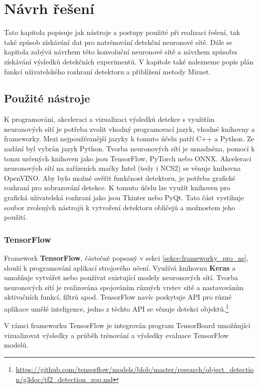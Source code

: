 \chapter{Návrh řešení}
Tato kapitola popisuje jak nástroje a postupy použité při realizaci řešení, tak také způsob získávání dat pro natrénování detekční neuronové sítě. Dále se kapitola zabývá návrhem této konvoluční neuronové sítě a návrhem způsobu získávání výsledků detekčních experimentů. V kapitole také nalezneme popis plán funkcí uživatelského rozhraní detektoru a přiblížení metody Mirnet.

\section{Použité nástroje}
\label{sekce:pouzite_nastroje}
K programování, akceleraci a vizualizaci výsledků detekce s využitím neuronových sítí je potřeba zvolit vhodný programovací jazyk, vhodné knihovny a frameworky. Mezi nejpoužívanější jazyky k tomuto účelu patří C++ a Python. Ze zadání byl vybrán jazyk Python. Tvorba neuronových sítí je usnadněna, pomocí k tomu určených knihoven jako jsou TensorFlow, PyTorch nebo ONNX. Akceleraci neuronových sítí na zařízeních značky Intel (tedy i NCS2) se věnuje knihovna OpenVINO. Aby bylo možné ověřit funkčnost detektoru, je potřeba grafické rozhraní pro zobrazování detekce. K tomuto účelu lze využít knihoven pro grafická uživatelská rozhraní jako jsou Tkinter nebo PyQt. Tato část vystihuje soubor zvolených nástrojů k vytvoření detektoru obličejů a možnostem jeho použití.

\subsection*{TensorFlow}
Framework \textbf{TensorFlow}, částečně popsaný v sekci \ref{sekce:frameworky_pro_ns}, slouží k programování aplikací strojového učení. Využívá knihovnu \textbf{Keras} a umožňuje vytvářet nebo používat existující modely neuronových sítí. Tvorba neuronových sítí je realizována spojováním různých vrstev sítě a nastavováním aktivačních funkcí, filtrů apod.
TensorFlow navíc poskytuje API pro různé aplikace umělé inteligence, jedno z těchto API se věnuje detekci objektů.\footnote{\url{https://github.com/tensorflow/models/blob/master/research/object_detection/g3doc/tf2_detection_zoo.md}}

V rámci frameworku TensorFlow je integrován program TensorBoard umožňující vizualizovat výsledky a průběh trénování a výsledky evaluace TensorFlow modelů.

